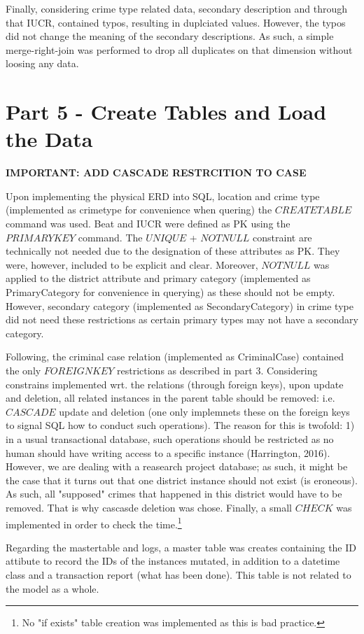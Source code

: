 \documentclass[a4paper]{article}
\begin{document}
Finally, considering crime type related data, secondary description and through that IUCR, contained typos, resulting in duplciated values. However, the typos did not change the meaning of the secondary descriptions. As such, a simple merge-right-join was performed to drop all duplicates on that dimension without loosing any data.

\section{Part 5 - Create Tables and Load the Data}
\textbf{IMPORTANT: ADD CASCADE RESTRCITION TO CASE}

Upon implementing the physical ERD into SQL, location and crime type (implemented as crimetype for convenience when quering) the $CREATE TABLE$ command was used. Beat and IUCR were defined as PK using the $PRIMARY KEY$ command. The $UNIQUE$ + $NOT NULL$ constraint are technically not needed due to the designation of these attributes as PK. They were, however, included to be explicit and clear. Moreover, $NOT NULL$ was applied to the district attribute and primary category (implemented as PrimaryCategory for convenience in querying) as these should not be empty. However, secondary category (implemented as SecondaryCategory) in crime type did not need these restrictions as certain primary types may not have a secondary category.

Following, the criminal case relation (implemented as CriminalCase) contained the only $FOREIGN KEY$ restrictions as described in part 3. Considering constrains implemented wrt. the relations (through foreign keys), upon update and deletion, all related instances in the parent table should be removed: i.e. $CASCADE$ update and deletion (one only implemnets these on the foreign keys to signal SQL how to conduct such operations). The reason for this is twofold: 1) in a usual transactional database, such operations should be restricted as no human should have writing access to a specific instance (Harrington, 2016). However, we are dealing with a reasearch project database; as such, it might be the case that it turns out that one district instance should not exist (is eroneous). As such, all "supposed" crimes that happened in this district would have to be removed. That is why cascasde deletion was chose. Finally, a small $CHECK$ was implemented in order to check the time.\footnote{No "if exists" table creation was implemented as this is bad practice.}

Regarding the mastertable and logs, a master table was creates containing the ID attibute to record the IDs of the instances mutated, in addition to a datetime class and a transaction report (what has been done). This table is not related to the model as a whole.
\end{document}
